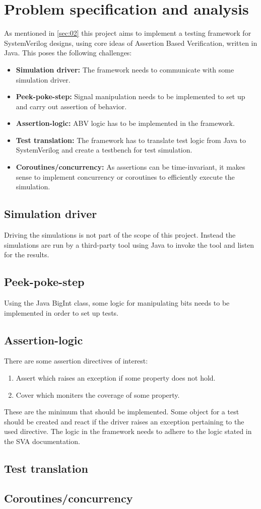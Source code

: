 \section{Problem specification and analysis}\label{sec:03}
As mentioned in \cref{sec:02} this project aims to implement a testing framework for SystemVerilog designs, using core ideas of Assertion Based Verification, written in Java. This poses the following challenges:
\begin{itemize}
    \item \textbf{Simulation driver:} The framework needs to communicate with some simulation driver.
    \item \textbf{Peek-poke-step:} Signal manipulation needs to be implemented to set up and carry out assertion of behavior.
    \item \textbf{Assertion-logic: } ABV logic has to be implemented in the framework.
    \item \textbf{Test translation:} The framework has to translate test logic from Java to SystemVerilog and create a testbench for test simulation.
    \item \textbf{Coroutines/concurrency:} As assertions can be time-invariant, it makes sense to implement concurrency or coroutines to efficiently execute the simulation.
\end{itemize}
\subsection{Simulation driver}
Driving the simulations is not part of the scope of this project. Instead the simulations are run by a third-party tool using Java to invoke the tool and listen for the results. 
\subsection{Peek-poke-step}
Using the Java BigInt class, some logic for manipulating bits needs to be implemented in order to set up tests.
\subsection{Assertion-logic}
There are some assertion directives of interest:
\begin{enumerate}
    \item Assert which raises an exception if some property does not hold.
    \item Cover which moniters the coverage of some property.
\end{enumerate}
These are the minimum that should be implemented. Some object for a test should be created and react if the driver raises an exception pertaining to the used directive.
The logic in the framework needs to adhere to the logic stated in the SVA documentation.
\subsection{Test translation}

\subsection{Coroutines/concurrency}
